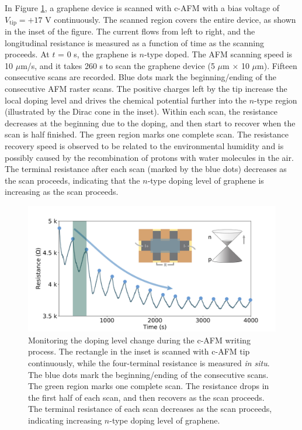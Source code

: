 \documentclass[pdflatex, sectionletters, 12pt]{pittetd}    %
\begin{document}
In Figure \ref{FIG:WritingResistance}, a graphene device is scanned with c-AFM with a bias voltage of $V_\mathrm{tip} = +17$ V continuously. The scanned region covers the entire device, as shown in the inset of the figure. The current flows from left to right, and the longitudinal resistance is measured as a function of time as the scanning proceeds. At $t$ = 0 s, the graphene is $n$-type doped. The AFM scanning speed is 10 $\mu$m/s, and it takes 260 s to scan the graphene device (5 $\mu$m $\times$ 10 $\mu$m). Fifteen consecutive scans are recorded. Blue dots mark the beginning/ending of the consecutive AFM raster scans. The positive charges left by the tip increase the local doping level and drives the chemical potential further into the $n$-type region (illustrated by the Dirac cone in the inset). Within each scan, the resistance decreases at the beginning due to the doping, and then start to recover when the scan is half finished. The green region marks one complete scan. The resistance recovery speed is observed to be related to the environmental humidity and is possibly caused by the recombination of protons with water molecules in the air. The terminal resistance after each scan (marked by the blue dots) decreases as the scan proceeds, indicating that the $n$-type doping level of graphene is increasing as the scan proceeds.
\\

\begin{figure}[h!]
	\centering
	\includegraphics[width=1\textwidth]{Drawing/WritingResistance.pdf}
	\caption{Monitoring the doping level change during the c-AFM writing process. The rectangle in the inset is scanned with c-AFM tip continuously, while the four-terminal resistance is measured \textit{in situ}. The blue dots mark the beginning/ending of the consecutive scans. The green region marks one complete scan. The resistance drops in the first half of each scan, and then recovers as the scan proceeds. The terminal resistance of each scan decreases as the scan proceeds, indicating increasing $n$-type doping level of graphene.}
	\label{FIG:WritingResistance}
\end{figure}
\end{document}
